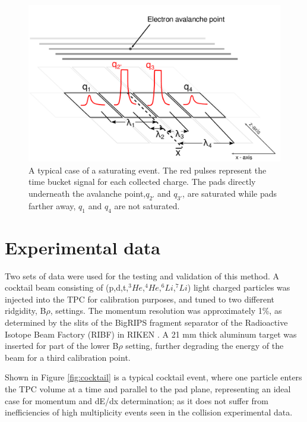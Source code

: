 \documentclass[review]{elsarticle}
\begin{document}
\begin{figure}[ht!]
\includegraphics[width=\linewidth]{saturated_pads}
\caption{A typical case of a saturating event. The red pulses represent the time bucket signal for each collected charge. The pads directly underneath the avalanche point,$q_{2'}$ and $q_{3'}$, are saturated while pads farther away, $q_1$ and $q_4$ are not saturated.}
\label{fig:satpad}
\end{figure}

\section{Experimental data}
Two sets of data were used for the testing and validation of this method. A cocktail beam consisting of (p,d,t,${}^3He$,${}^4He$,${}^6Li$,${}^7Li$) light charged particles was injected into the TPC for calibration purposes, and tuned to two different ridgidity, B$\rho$, settings. The momentum resolution was approximately 1\%, as determined by the slits of the BigRIPS fragment separator of the Radioactive Isotope Beam Factory (RIBF) in RIKEN \cite{bigrips}. A 21 mm thick aluminum target was inserted for part of the lower B$\rho$ setting, further degrading the energy of the beam for a third calibration point. 

Shown in Figure \ref{fig:cocktail} is a typical cocktail event, where one particle enters the TPC volume at a time and parallel to the pad plane, representing an ideal case for momentum and dE/dx determination; as it does not suffer from inefficiencies of high multiplicity events seen in the collision experimental data.  
\end{document}
